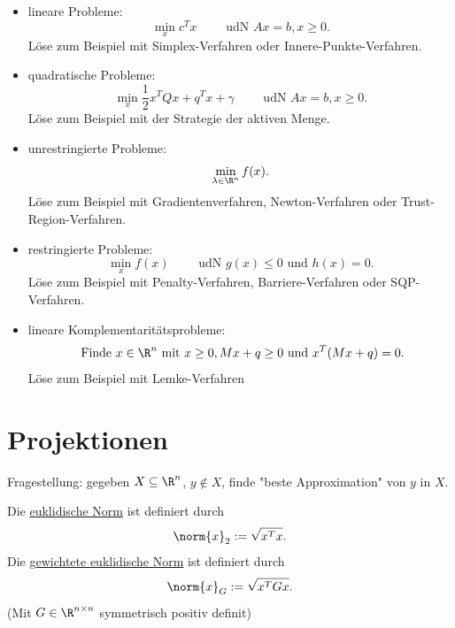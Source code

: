 \begin{itemize}
	\item lineare Probleme:
		\[
		\min\limits_{x}c^{T}x \qquad\text{ udN } Ax=b, x \geq 0
		.\] 
		Löse zum Beispiel mit Simplex-Verfahren oder Innere-Punkte-Verfahren.
	\item quadratische Probleme:
		\[
			\min\limits_{x}\frac{1}{2}x^{T}Qx + q^{T}x + \gamma \qquad\text{ udN } Ax=b, x\geq 0
		.\] 
		Löse zum Beispiel mit der Strategie der aktiven Menge.
	\item unrestringierte Probleme:
		\[
			\min\limits_{\lambda \in \R^{n}}f(x)
		.\] 
		Löse zum Beispiel mit Gradientenverfahren, Newton-Verfahren oder Trust-Region-Verfahren.
	\item restringierte Probleme:
		\[
			\min\limits_{x} f(x) \qquad\text{ udN } g(x) \leq 0 \text{ und } h(x) = 0
		.\] 
		Löse zum Beispiel mit Penalty-Verfahren, Barriere-Verfahren oder SQP-Verfahren.
	\item lineare Komplementaritätsprobleme:
		\[
			\text{ Finde }x \in \R^{n} \text{ mit } x \geq 0, Mx+q \geq 0 \text{ und }x^{T}(Mx+q) = 0
		.\] 
		Löse zum Beispiel mit Lemke-Verfahren
\end{itemize}

\section{Projektionen}%
\label{sec:Projektionen}

Fragestellung: gegeben $X \subseteq \R^{n}$, $y \not \in X$, finde "beste Approximation" von $y$ in $X$.

\begin{definition}
\label{thm:euklidischenorm}
	Die \underline{euklidische Norm} ist definiert durch
	\[
	\norm{x} _{2}:= \sqrt{x^{T}x}  
	.\] 
	Die \underline{gewichtete euklidische Norm} ist definiert durch
	\[
	\norm{x} _{G}:= \sqrt{x^{T}Gx} 
	.\] 
	(Mit $G \in \R^{n \times n}$ symmetrisch positiv definit)
\end{definition}

